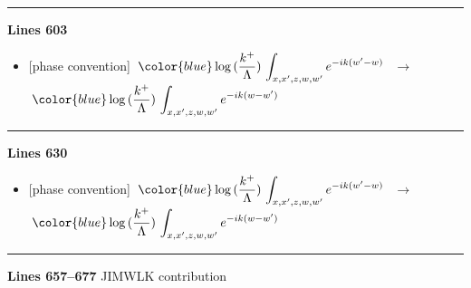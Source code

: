 \documentclass[10pt]{article}
\begin{document}
\noindent\rule{\linewidth}{0.3pt}\par\noindent\textbf{Lines 603} \par
\begin{itemize}[leftmargin=2.2em,itemsep=1pt,topsep=2pt]
\item[\textbf{l.603}] \textsf{\small [phase convention]} $\displaystyle \,{\color{blue}\log{(\frac{k^{+}}{\Lambda})}}\,\int_{x,x',z,w,w'}e^{-ik(w'-w)}\,$\ $\longrightarrow$\ $\displaystyle \,{\color{blue}\log{(\frac{k^{+}}{\Lambda})}}\,\int_{x,x',z,w,w'}e^{-ik(w-w')}\,$
\end{itemize}
\noindent\rule{\linewidth}{0.3pt}\par\noindent\textbf{Lines 630} \par
\begin{itemize}[leftmargin=2.2em,itemsep=1pt,topsep=2pt]
\item[\textbf{l.630}] \textsf{\small [phase convention]} $\displaystyle \,{\color{blue}\log{(\frac{k^{+}}{\Lambda})}}\,\int_{x,x',z,w,w'}e^{-ik(w'-w)}\,$\ $\longrightarrow$\ $\displaystyle \,{\color{blue}\log{(\frac{k^{+}}{\Lambda})}}\,\int_{x,x',z,w,w'}e^{-ik(w-w')}\,$
\end{itemize}
\noindent\rule{\linewidth}{0.3pt}\par\noindent\textbf{Lines 657--677} \quad \textsf{JIMWLK contribution} \par
\end{document}
